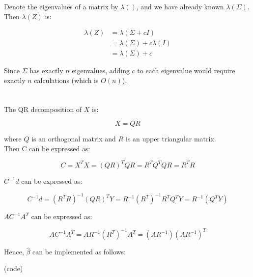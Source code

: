 \documentclass[12pt]{article}
\begin{document}
Denote the eigenvalues of a matrix by $\lambda()$, and we have already known $\lambda(\Sigma)$. Then $\lambda(Z)$ is:

\begin{equation*}
\begin{split}
\lambda(Z)&=\lambda(\Sigma+cI)\\
&=\lambda(\Sigma)+c\lambda(I)\\
&=\lambda(\Sigma)+c
\end{split}
\end{equation*}

\noindent Since $\Sigma$ has exactly $n$ eigenvalues, adding $c$ to each eigenvalue would require exactly $n$ calculations (which is $O(n)$).

\section{}

\subsection{}

The QR decomposition of $X$ is:

\begin{equation*}
X=QR
\end{equation*}

\noindent where $Q$ is an orthogonal matrix and $R$ is an upper triangular matrix.\\

\noindent Then C can be expressed as:

\begin{equation*}
C=X^TX=(QR)^TQR=R^TQ^TQR=R^TR
\end{equation*}

\noindent $C^{-1}d$ can be expressed as:

\begin{equation*}
C^{-1}d=(R^TR)^{-1}(QR)^TY=R^{-1}(R^T)^{-1}R^TQ^TY=R^{-1}(Q^TY)
\end{equation*}

\noindent $AC^{-1}A^T$ can be expressed as:

\begin{equation*}
AC^{-1}A^T=AR^{-1}(R^T)^{-1}A^T=(AR^{-1})(AR^{-1})^{T}
\end{equation*}

\noindent Hence, $\hat{\beta}$ can be implemented as follows:

(code)
\end{document}
